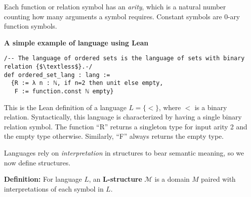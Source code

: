 \documentclass[landscape]{sciposter}
\newcommand{\eion}[1]{{\color{cyan}\bfseries [#1]}}
\begin{document}
\begin{multicols}{3}
Each function or relation symbol has an {\sl arity}, which is a natural number counting how many arguments a symbol requires. Constant symbols are \(0\)-ary function symbols.


\textbf{A simple example of language using Lean}
\begin{lstlisting}
/-- The language of ordered sets is the language of sets with binary relation {$\textless$}.-/
def ordered_set_lang : lang :=
  {R := λ n : ℕ, if n=2 then unit else empty,
   F := function.const ℕ empty}
\end{lstlisting}

This is the Lean definition of a language $L = \{<\}$, where $<$ is a binary relation.
Syntactically, this language is characterized by having a single binary relation symbol. The function ``R'' returns a singleton type for input arity 2 and the empty type otherwise. Similarly, ``F'' always returns the empty type.



Languages rely on {\sl interpretation} in structures to bear semantic meaning, so we now define structures.

\textbf{Definition:} For language $L$, an \textbf{L-structure} $\mathcal{M}$ is a domain $M$ paired with interpretations of each symbol in $L$.


\end{multicols}
\end{document}
